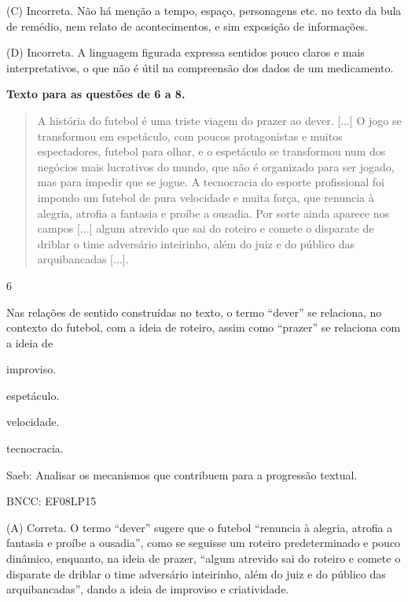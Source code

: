 (C) Incorreta. Não há menção a tempo, espaço, personagens etc. no texto
da bula de remédio, nem relato de acontecimentos, e sim exposição de
informações.

(D) Incorreta. A linguagem figurada expressa sentidos pouco claros e
mais interpretativos, o que não é útil na compreensão dos dados de um
medicamento.

\textbf{Texto para as questões de 6 a 8.}

\begin{quote}
A história do futebol é uma triste viagem do prazer ao dever. {[}...{]}
O jogo se transformou em espetáculo, com poucos protagonistas e muitos
espectadores, futebol para olhar, e o espetáculo se transformou num dos
negócios mais lucrativos do mundo, que não é organizado para ser jogado,
mas para impedir que se jogue. A tecnocracia do esporte profissional foi
impondo um futebol de pura velocidade e muita força, que renuncia à
alegria, atrofia a fantasia e proíbe a ousadia. Por sorte ainda aparece
nos campos {[}...{]} algum atrevido que sai do roteiro e comete o
disparate de driblar o time adversário inteirinho, além do juiz e do
público das arquibancadas {[}...{]}.
\end{quote}


\num{6}

Nas relações de sentido construídas no texto, o termo ``dever'' se
relaciona, no contexto do futebol, com a ideia de roteiro, assim como
``prazer'' se relaciona com a ideia de

\begin{escolha}
\item improviso.

\item espetáculo.

\item velocidade.

\item tecnocracia.
\end{escolha}

Saeb: Analisar os mecanismos que contribuem para a progressão textual.

BNCC: EF08LP15

(A) Correta. O termo ``dever'' sugere que o futebol ``renuncia à
alegria, atrofia a fantasia e proíbe a ousadia'', como se seguisse um
roteiro predeterminado e pouco dinâmico, enquanto, na ideia de prazer,
``algum atrevido sai do roteiro e comete o disparate de driblar o time
adversário inteirinho, além do juiz e do público das arquibancadas'',
dando a ideia de improviso e criatividade.


